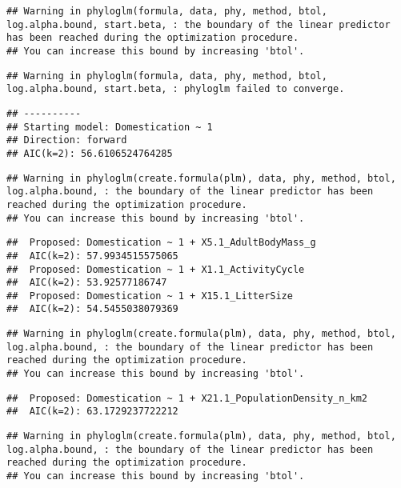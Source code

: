\documentclass[
]{article}
\begin{document}
\begin{verbatim}
## Warning in phyloglm(formula, data, phy, method, btol, log.alpha.bound, start.beta, : the boundary of the linear predictor has been reached during the optimization procedure.
## You can increase this bound by increasing 'btol'.
\end{verbatim}

\begin{verbatim}
## Warning in phyloglm(formula, data, phy, method, btol, log.alpha.bound, start.beta, : phyloglm failed to converge.
\end{verbatim}

\begin{verbatim}
## ----------
## Starting model: Domestication ~ 1
## Direction: forward
## AIC(k=2): 56.6106524764285
\end{verbatim}

\begin{verbatim}
## Warning in phyloglm(create.formula(plm), data, phy, method, btol, log.alpha.bound, : the boundary of the linear predictor has been reached during the optimization procedure.
## You can increase this bound by increasing 'btol'.
\end{verbatim}

\begin{verbatim}
##  Proposed: Domestication ~ 1 + X5.1_AdultBodyMass_g
##  AIC(k=2): 57.9934515575065
##  Proposed: Domestication ~ 1 + X1.1_ActivityCycle
##  AIC(k=2): 53.92577186747
##  Proposed: Domestication ~ 1 + X15.1_LitterSize
##  AIC(k=2): 54.5455038079369
\end{verbatim}

\begin{verbatim}
## Warning in phyloglm(create.formula(plm), data, phy, method, btol, log.alpha.bound, : the boundary of the linear predictor has been reached during the optimization procedure.
## You can increase this bound by increasing 'btol'.
\end{verbatim}

\begin{verbatim}
##  Proposed: Domestication ~ 1 + X21.1_PopulationDensity_n_km2
##  AIC(k=2): 63.1729237722212
\end{verbatim}

\begin{verbatim}
## Warning in phyloglm(create.formula(plm), data, phy, method, btol, log.alpha.bound, : the boundary of the linear predictor has been reached during the optimization procedure.
## You can increase this bound by increasing 'btol'.
\end{verbatim}
\end{document}
